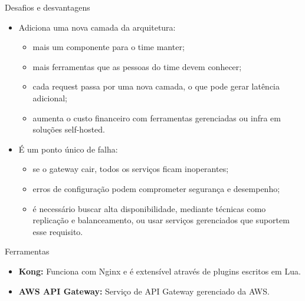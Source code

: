 \begin{frame}[fragile]{Desafios e desvantagens}
\begin{itemize}%
        \item Adiciona uma nova camada da arquitetura:
            \begin{itemize}
                \item mais um componente para o time manter;
                \item mais ferramentas que as pessoas do time devem conhecer;
                \item cada request passa por uma nova camada, o que pode gerar latência adicional;
                \item aumenta o custo financeiro com ferramentas gerenciadas ou infra em soluções self-hosted.
            \end{itemize}
        \item É um ponto único de falha:
            \begin{itemize}
                \item se o gateway cair, todos os serviços ficam inoperantes;
                \item erros de configuração podem comprometer segurança e desempenho;
                \item é necessário buscar alta disponibilidade, mediante técnicas como replicação e balanceamento, ou usar serviços gerenciados que suportem esse requisito.
            \end{itemize}
    \end{itemize}
\end{frame}

\begin{frame}[fragile]{Ferramentas}
    \begin{itemize}%
        \item \textbf{Kong:} Funciona com Nginx e é extensível através de plugins escritos em Lua.
        \item \textbf{AWS API Gateway:} Serviço de API Gateway gerenciado da AWS.
    \end{itemize}
\end{frame}